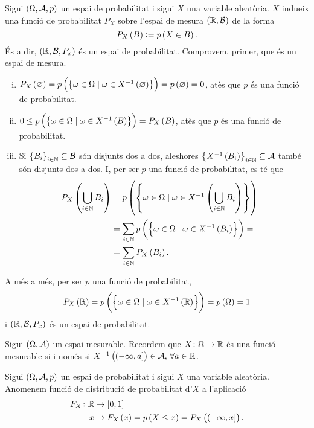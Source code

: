 \begin{obs}
    Sigui $\left(\Omega,\mathcal{A},p\right)$ un espai de probabilitat i sigui $X$ una variable aleatòria. $X$ indueix una funció de probabilitat $P_X$ 
    sobre l'espai de mesura $\left(\mathbb{R},\mathcal{B}\right)$ de la forma
    \[
        P_X\left( B\right):=p\left( X\in B\right).
    \]
    És a dir, $\left(\mathbb{R},\mathcal{B},P_x\right)$ és un espai de probabilitat. Comprovem, primer, que és un espai de mesura.
    \begin{enumerate}[i)]
        \item $P_X\left(\varnothing\right)=p\left(\left\{\omega\in\Omega\mid\omega\in X^{-1}\left( \varnothing\right)\right\}\right)=p\left(\varnothing\right)=0$, atès que $p$ és una funció de probabilitat.
        \item $0\leq p\left(\left\{\omega\in\Omega\mid\omega\in X^{-1}\left( B\right)\right\}\right) = P_X\left( B\right)$, atès que $p$ és una funció de probabilitat. 
        \item Si $\left\{ B_i\right\}_{i\in\mathbb{N}}\subseteq\mathcal{B}$ són disjunts dos a dos, aleshores $\left\{ X^{-1}\left( B_i\right)\right\}_{i\in\mathbb{N}}\subseteq\mathcal{A}$ també són disjunts dos a dos. I, per ser $p$ una funció de probabilitat, es té que
        \begin{align*}
            P_X\left( \bigcup_{i\in\mathbb{N}} B_i\right) &= p\left(\left\{\omega\in\Omega\mid\omega\in X^{-1}\left( \bigcup_{i\in\mathbb{N}} B_i\right)\right\}\right) =\\
            &= \sum_{i\in\mathbb{N}} p\left(\left\{\omega\in\Omega\mid\omega\in X^{-1}\left( B_i\right)\right\}\right)=\\
            &=\sum_{i\in\mathbb{N}}P_X\left( B_i\right).
        \end{align*}
    \end{enumerate}
    A més a més, per ser $p$ una funció de probabilitat,
    \[
        P_X\left(\mathbb{R}\right) = p\left(\left\{\omega\in\Omega\mid\omega\in X^{-1}\left(\mathbb{R}\right)\right\}\right) = p\left(\Omega\right)=1
    \]
    i $\left(\mathbb{R},\mathcal{B},P_x\right)$ és un espai de probabilitat.
\end{obs}

\begin{obs}
    Sigui $\left(\Omega,\mathcal{A}\right)$ un espai mesurable. Recordem que $X\colon\Omega\to\mathbb{R}$ és una funció mesurable si i només si $X^{-1}\left(\left(-\infty, a\right]\right)\in\mathcal{A},\,\forall a\in\mathbb{R}$.
\end{obs}

\begin{defi}
    Sigui $\left(\Omega,\mathcal{A}, p\right)$ un espai de probabilitat i sigui $X$ una variable aleatòria. Anomenem funció de distribució de probabilitat d'$X$ a l'aplicació
    \begin{align*}
        F_X\colon\mathbb{R} &\to\left[ 0,1\right]\\
        x &\mapsto F_X\left( x\right) = p\left( X\leq x\right) = P_X\left(\left(-\infty,x\right]\right).
    \end{align*}
\end{defi}

